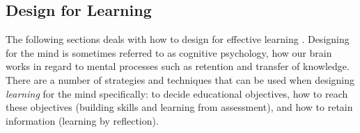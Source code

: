 \subsection{Design for Learning}


The following sections deals with how to design for effective learning \citep{dirksen}. Designing for the mind is sometimes referred to as cognitive psychology, how our brain works in regard to mental processes such as retention and transfer of knowledge. There are a number of strategies and techniques that can be used when designing \textit{learning} for the mind specifically: to decide educational objectives, how to reach these objectives (building skills and learning from assessment), and how to retain information (learning by reflection).






%

